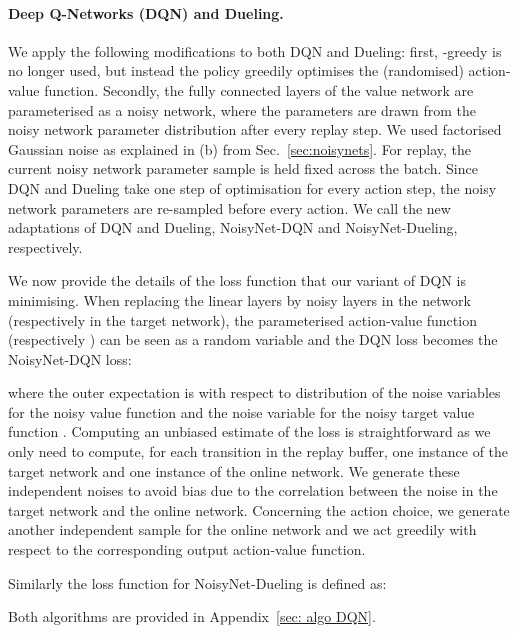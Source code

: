 \documentclass{article}
\newcommand{\algoinit}{NoisyNet}
\begin{document}
\paragraph{Deep Q-Networks (DQN) and Dueling.}
We apply the following modifications to both  DQN and Dueling: first, -greedy is no longer used, but instead the policy greedily optimises the (randomised) action-value function.
Secondly, the fully connected layers of the value network are parameterised as a noisy network, where the parameters are drawn from the noisy network parameter distribution after every replay step. We used factorised Gaussian noise as explained in (b) from Sec.~\ref{sec:noisynets}.
For replay, the current noisy network parameter sample is held fixed across the batch.
Since DQN and Dueling take one step of optimisation for every action step, the noisy network parameters are re-sampled before every action.
We call the new adaptations  of DQN and Dueling, \algoinit{}-DQN and \algoinit{}-Dueling, respectively.

We now provide the details of the loss function that our variant of DQN is minimising.  When replacing the linear layers by noisy layers in the network (respectively in the target network), the parameterised action-value function  (respectively ) can be seen as a random variable and the DQN loss becomes the \algoinit{}-DQN loss:
 
\noindent where the outer expectation is with respect to distribution of the noise variables  for the noisy value function  and the noise variable  for the noisy target value function .
 Computing an unbiased estimate of the loss is straightforward as we only need to compute, for each transition in the replay buffer, one instance of the target network and one instance of the online network. We generate these independent noises to avoid bias due to the correlation between the noise in the target network and the online network. Concerning the action choice, we generate another independent sample   for the online network and we act greedily with respect to the corresponding  output action-value function. 


Similarly the loss function for \algoinit{}-Dueling is defined as:
 
 
 Both algorithms are provided in Appendix~\ref{sec: algo DQN}.
\end{document}
